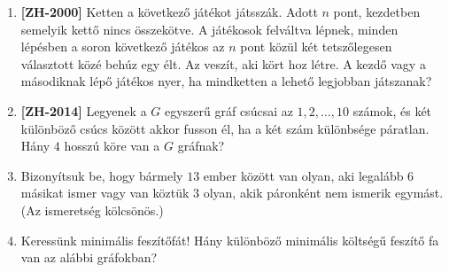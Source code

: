 \documentclass[a4paper,12pt]{article}
\begin{document}
\begin{enumerate}
        \item \textbf{[ZH-2000]} Ketten a következő játékot játsszák. Adott $n$ pont, kezdetben semelyik kettő nincs összekötve. A játékosok felváltva lépnek, minden lépésben a soron következő játékos az $n$ pont közül két tetszőlegesen választott közé behúz egy élt. Az veszít, aki kört hoz létre. A kezdő vagy a másodiknak lépő játékos nyer, ha mindketten a lehető legjobban játszanak?

        \item \textbf{[ZH-2014]} Legyenek a $G$ egyszerű gráf csúcsai az $1,2,\ldots,10$ számok, és két különböző csúcs között akkor fusson él, ha a két szám különbsége páratlan. Hány $4$ hosszú köre van a $G$ gráfnak?
        
        \item Bizonyítsuk be, hogy bármely $13$ ember között van olyan, aki legalább $6$ másikat ismer vagy van köztük $3$ olyan, akik páronként nem ismerik egymást. (Az ismeretség kölcsönös.)
        
        \item Keressünk minimális feszítőfát! Hány különböző minimális költségű feszítő fa van az alábbi gráfokban?
        \begin{figure}[!h]
            \centering
            \hfill
             \hfill
             \hfill
             \hfill
        \end{figure}




\end{enumerate}
\end{document}
